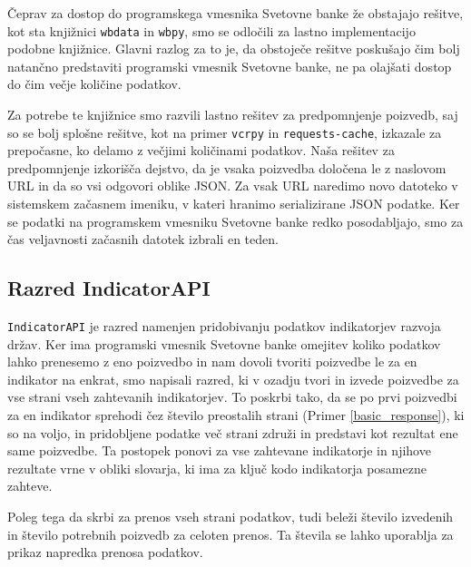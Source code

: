Čeprav za dostop do programskega vmesnika Svetovne banke že obstajajo 
rešitve, kot sta knjižnici 
\verb|wbdata| in
\verb|wbpy|, smo se odločili
za lastno implementacijo podobne knjižnice. Glavni razlog za to je, da
obstoječe rešitve poskušajo čim bolj natančno predstaviti programski
vmesnik Svetovne banke, ne pa olajšati dostop do čim večje količine
podatkov.

Za potrebe te knjižnice smo razvili lastno rešitev za predpomnjenje poizvedb,
saj so se bolj splošne rešitve, kot na primer
\verb|vcrpy| in
\verb|requests-cache|,
izkazale za prepočasne, ko delamo z večjimi količinami podatkov. Naša
rešitev za predpomnjenje izkorišča dejstvo, da je vsaka poizvedba določena le
z naslovom URL in da so vsi odgovori oblike JSON. Za vsak URL naredimo novo
datoteko v sistemskem začasnem imeniku, v kateri hranimo serializirane JSON
podatke. Ker se podatki na programskem vmesniku Svetovne banke redko
posodabljajo, smo za čas veljavnosti začasnih datotek izbrali en teden.



\subsection{Razred IndicatorAPI}
\label{razered_indicator_api}

\verb|IndicatorAPI| je razred namenjen pridobivanju podatkov indikatorjev
razvoja držav. Ker ima programski vmesnik Svetovne banke omejitev koliko 
podatkov lahko prenesemo z eno poizvedbo in nam dovoli tvoriti poizvedbe le za
en indikator na enkrat, smo napisali razred, ki v ozadju tvori in izvede
poizvedbe za vse strani vseh zahtevanih indikatorjev. To poskrbi tako, da se po
prvi poizvedbi za en indikator sprehodi čez število preostalih strani 
(Primer \ref{basic_response}), ki so na voljo, in pridobljene podatke več
strani združi in predstavi kot rezultat ene same poizvedbe. Ta postopek ponovi
za vse zahtevane indikatorje in njihove rezultate vrne v obliki slovarja, ki 
ima za ključ kodo indikatorja posamezne zahteve.

Poleg tega da skrbi za prenos vseh strani podatkov, tudi beleži število 
izvedenih in število potrebnih poizvedb za celoten prenos. Ta števila se
lahko uporablja za prikaz napredka prenosa podatkov.


